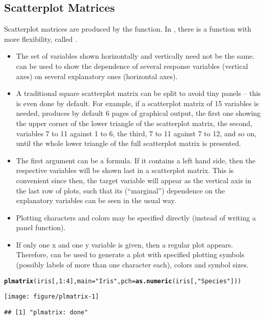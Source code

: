\documentclass[11pt]{article}\usepackage[]{graphicx}\usepackage[]{color}
\makeatletter
\def\maxwidth{ %
  \ifdim\Gin@nat@width>\linewidth
    \linewidth
  \else
    \Gin@nat@width
  \fi
}
\newcommand{\hlnum}[1]{\textcolor[rgb]{0.686,0.059,0.569}{#1}}%
\newcommand{\hlstr}[1]{\textcolor[rgb]{0.192,0.494,0.8}{#1}}%
\newcommand{\hlopt}[1]{\textcolor[rgb]{0,0,0}{#1}}%
\newcommand{\hlstd}[1]{\textcolor[rgb]{0.345,0.345,0.345}{#1}}%
\newcommand{\hlkwc}[1]{\textcolor[rgb]{0.333,0.667,0.333}{#1}}%
\newcommand{\hlkwd}[1]{\textcolor[rgb]{0.737,0.353,0.396}{\textbf{#1}}}%
\newenvironment{kframe}{%
 \def\at@end@of@kframe{}%
 \ifinner\ifhmode%
  \def\at@end@of@kframe{\end{minipage}}%
  \begin{minipage}{\columnwidth}%
 \fi\fi%
 \def\FrameCommand##1{\hskip\@totalleftmargin \hskip-\fboxsep
 \colorbox{shadecolor}{##1}\hskip-\fboxsep
     \hskip-\linewidth \hskip-\@totalleftmargin \hskip\columnwidth}%
 \MakeFramed {\advance\hsize-\width
   \@totalleftmargin\z@ \linewidth\hsize
   \@setminipage}}%
 {\par\unskip\endMakeFramed%
 \at@end@of@kframe}
\newenvironment{knitrout}{}{} %
\makeatother
\begin{document}
\subsection{Scatterplot Matrices}
Scatterplot matrices are produced by the  function.
In , there is a function with more flexibility, called
.
\begin{itemize}
\item 
  The set of variables shown horizontally and vertically need not be the
  same.  can be used to show the dependence of several 
  response variables (vertical axes) on several explanatory ones
  (horizontal axes).
\item
  A traditional square scatterplot matrix can be split to avoid
  tiny panels -- this is even done by default. For example, if 
  a scatterplot matrix of 15 variables is needed, 
   produces by default 6 pages of graphical output,
  the first one showing the %
  upper corner of the lower triangle of the scatterplot matrix,
  the second, variables 7 to 11 against 1 to 6, the third, 
  7 to 11 against 7 to 12, and so on, until the whole lower triangle
  of the full scatterplot matrix is presented.
\item
  The first argument can be a formula. If it contains a left hand side,
  then the respective variables will be shown last in a scatterplot
  matrix. This is convenient since then, the target variable will appear as
  the vertical axis in the last row of plots, such that its (``marginal'')
  dependence on the explanatory variables can be seen in the usual way.
\item
  Plotting characters and colors may be specified directly (instead of 
  writing a panel function).
\item
  If only one x and one y variable is given, then a regular plot appears.
  Therefore,  can be used to generate a plot with specified
  plotting symbols (possibly labels of more than one character each),
  colors and symbol sizes.
\end{itemize}

\Bfig
\begin{knitrout}
\color{fgcolor}\begin{kframe}
\begin{alltt}
\hlkwd{plmatrix}\hlstd{(iris[,}\hlnum{1}\hlopt{:}\hlnum{4}\hlstd{],} \hlkwc{main}\hlstd{=}\hlstr{"Iris"}\hlstd{,} \hlkwc{pch}\hlstd{=}\hlkwd{as.numeric}\hlstd{(iris[,}\hlstr{"Species"}\hlstd{]))}
\end{alltt}
\end{kframe}
\texttt{[image: figure/plmatrix-1]} 
\begin{kframe}\begin{verbatim}
## [1] "plmatrix: done"
\end{verbatim}
\end{kframe}
\end{knitrout}
\end{document}
